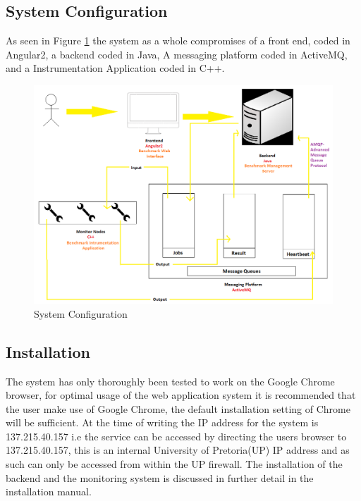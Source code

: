 \documentclass[11pt,a4paper]{article}
\begin{document}
\subsection{System Configuration}
As seen in Figure \ref{fig:config} the system as a whole compromises of a front end, coded in Angular2,
a backend coded in Java, A messaging platform coded in ActiveMQ, and a Instrumentation Application coded
in C++.
\begin{figure}[H]
	\begin{center}
		\includegraphics[scale=0.5]{../Images/User Manual/System Configuration.png}
		\caption{System Configuration}
		\label{fig:config}
	\end{center}  
\end{figure}
  
\subsection{Installation}
The system has only thoroughly been tested to work on the Google Chrome browser, for optimal usage of the 
web application system it is recommended that the user make use of Google Chrome, the default installation
setting of Chrome will be sufficient. At the time of writing the IP address for the system is 137.215.40.157
i.e the service can be accessed by directing the users browser to 137.215.40.157, this is an internal 
University of Pretoria(UP) IP address and as such can only be accessed from within the UP firewall. The 
installation of the backend and the monitoring system is discussed in further detail in the installation manual.
\clearpage
\end{document}
